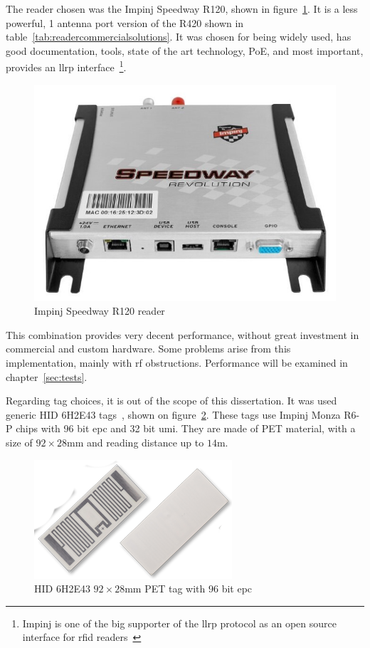 The reader chosen was the Impinj Speedway R120, shown in figure~\ref{fig:impinjr120}. It is a less powerful, 1 antenna port version of the R420 shown in table~\ref{tab:readercommercialsolutions}. It was chosen for being widely used, has good documentation, tools, state of the art technology, PoE, and most important, provides an \ac{llrp} interface~\footnote{Impinj is one of the big supporter of the \ac{llrp} protocol as an open source interface for \ac{rfid} readers~\cite{SevenRFIDOrganizations}}.

\begin{figure}
    \centering
    \includegraphics[width=0.6\linewidth]{./figs/Speedway_Revolution_R120.jpg}
    \caption[Impinj Speedway R120 reader]{Impinj Speedway R120 reader~\cite{ImpinjSolucoesRAIN}} 
    \label{fig:impinjr120}
\end{figure}

This combination provides very decent performance, without great investment in commercial and custom hardware. Some problems arise from this implementation, mainly with \ac{rf} obstructions. Performance will be examined in chapter~\ref{sec:tests}.  

Regarding tag choices, it is out of the scope of this dissertation. It was used generic HID 6H2E43 tags~\cite{HidetiquetasrfidPdf}, shown on figure~\ref{fig:6H2E43}.
These tags use Impinj Monza R6-P chips with 96 bit \ac{epc} and 32 bit \ac{umi}. They are made of PET material, with a size of $92\times28$mm and reading distance up to $14$m.

\begin{figure}
    \centering
    \includegraphics[width=0.6\linewidth]{./figs/6H2E43.png}
    \caption[HID 6H2E43 $92\times28$mm PET tag with $96$ bit \acs{epc}]{HID 6H2E43 $92\times28$mm PET tag with $96$ bit \acs{epc}~\cite{EtusivuIDcontrol}} 
    \label{fig:6H2E43}
\end{figure}

